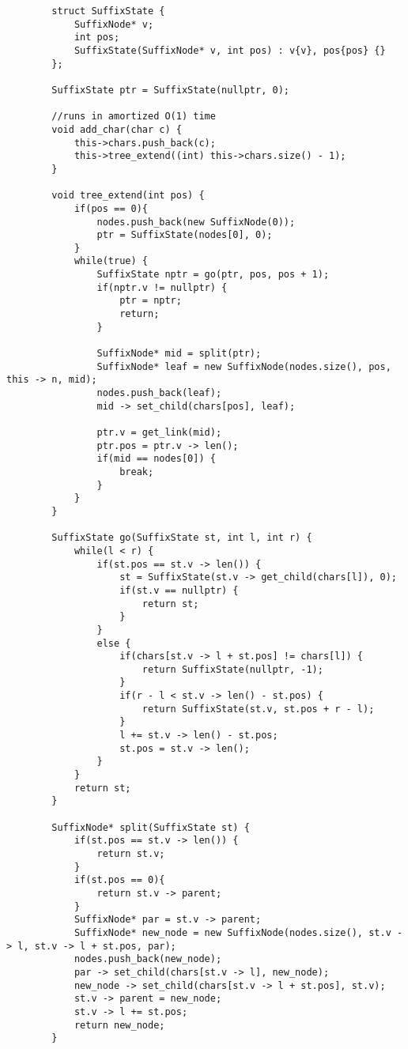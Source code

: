 \documentclass[8pt, headheight=10pt, a4paper]{article}
\begin{document}
\begin{multicols*}{3}
\begin{lstlisting}
        struct SuffixState {
            SuffixNode* v;
            int pos;
            SuffixState(SuffixNode* v, int pos) : v{v}, pos{pos} {}
        };

        SuffixState ptr = SuffixState(nullptr, 0);

        //runs in amortized O(1) time
        void add_char(char c) {
            this->chars.push_back(c);
            this->tree_extend((int) this->chars.size() - 1);
        }

        void tree_extend(int pos) {
            if(pos == 0){
                nodes.push_back(new SuffixNode(0));
                ptr = SuffixState(nodes[0], 0);
            }
            while(true) {
                SuffixState nptr = go(ptr, pos, pos + 1);
                if(nptr.v != nullptr) {
                    ptr = nptr;
                    return;
                }

                SuffixNode* mid = split(ptr);
                SuffixNode* leaf = new SuffixNode(nodes.size(), pos, this -> n, mid);
                nodes.push_back(leaf);
                mid -> set_child(chars[pos], leaf);

                ptr.v = get_link(mid);
                ptr.pos = ptr.v -> len();
                if(mid == nodes[0]) {
                    break;
                }
            }
        }

        SuffixState go(SuffixState st, int l, int r) {
            while(l < r) {
                if(st.pos == st.v -> len()) {
                    st = SuffixState(st.v -> get_child(chars[l]), 0);
                    if(st.v == nullptr) {
                        return st;
                    }
                }
                else {
                    if(chars[st.v -> l + st.pos] != chars[l]) {
                        return SuffixState(nullptr, -1);
                    }
                    if(r - l < st.v -> len() - st.pos) {
                        return SuffixState(st.v, st.pos + r - l);
                    }
                    l += st.v -> len() - st.pos;
                    st.pos = st.v -> len();
                }
            }
            return st;
        }

        SuffixNode* split(SuffixState st) {
            if(st.pos == st.v -> len()) {
                return st.v;
            }
            if(st.pos == 0){
                return st.v -> parent;
            }
            SuffixNode* par = st.v -> parent;
            SuffixNode* new_node = new SuffixNode(nodes.size(), st.v -> l, st.v -> l + st.pos, par);
            nodes.push_back(new_node);
            par -> set_child(chars[st.v -> l], new_node);
            new_node -> set_child(chars[st.v -> l + st.pos], st.v);
            st.v -> parent = new_node;
            st.v -> l += st.pos;
            return new_node;
        }


\end{lstlisting}
\end{multicols*}
\end{document}
